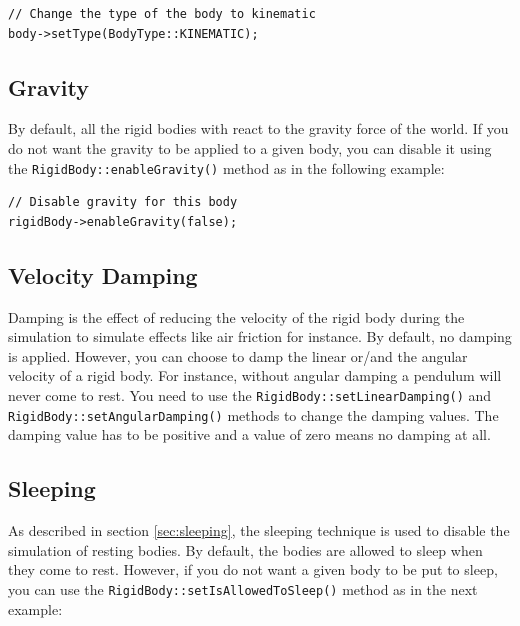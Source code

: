 \documentclass[a4paper,12pt]{article}
\begin{document}
    \begin{lstlisting}
// Change the type of the body to kinematic
body->setType(BodyType::KINEMATIC);
  \end{lstlisting}

    \subsection{Gravity}

    By default, all the rigid bodies with react to the gravity force of the world. If you do not want the gravity to be applied to a given body, you can disable
    it using the \texttt{RigidBody::enableGravity()} method as in the following example: \\

    \begin{lstlisting}
// Disable gravity for this body
rigidBody->enableGravity(false);
  \end{lstlisting}


    \subsection{Velocity Damping}

    \begin{sloppypar}
      Damping is the effect of reducing the velocity of the rigid body during the simulation to simulate effects like air friction for instance. By default, no damping
      is applied. However, you can choose to damp the linear or/and the angular velocity of a rigid body. For instance, without angular damping a pendulum will never come
      to rest. You need to use the \texttt{RigidBody::setLinearDamping()} and \texttt{RigidBody::setAngularDamping()} methods to change the damping values. The damping
      value has to be positive and a value of zero means no damping at all.
    \end{sloppypar}

    \subsection{Sleeping}
    \label{sec:rigidbodysleeping}

    As described in section \ref{sec:sleeping}, the sleeping technique is used to disable the simulation of resting bodies. By default, the bodies are
    allowed to sleep when they come to rest. However, if you do not want a given body to be put to sleep, you can use the
    \texttt{RigidBody::setIsAllowedToSleep()} method as in the next example: \\
\end{document}
